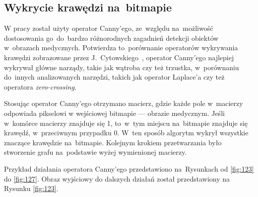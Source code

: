 \documentclass[a4paper,11pt,twoside,openright]{report}
\theoremstyle{definition}
\begin{document}
\subsection {Wykrycie krawędzi na~bitmapie}

W pracy został użyty operator Canny'ego, ze~względu na~możliwość dostosowania
go~do~bardzo różnorodnych zagadnień detekcji obiektów w~obrazach medycznych.
Potwierdza to~porównanie operatorów wykrywania krawędzi zobrazowane przez
J.~Cytowskiego~\cite{Cyfrowe przetwarzanie obrazów medycznych}, operator Canny'ego
najlepiej wykrywał główne narządy, takie jak wątroba czy też trzustka, w~porównaniu
do~innych analizowanych narzędzi, takich jak operator Laplace'a czy też operatora \textit{zero-crossing}.

Stosując operator Canny'ego otrzymano macierz, gdzie każde pole w~macierzy odpowiada pikselowi
w wejściowej bitmapie --- obrazie medycznym. Jeśli w~komórce macierzy znajduje
się 1, to~w~tym miejscu na~bitmapie znajduje się krawędź, w~przeciwnym przypadku
0. W~ten sposób algorytm wykrył wszystkie znaczące krawędzie na~bitmapie. Kolejnym
krokiem przetwarzania było stworzenie grafu na~podstawie wyżej wymienionej macierzy.

Przykład działania operatora Canny'ego przedstawiono na~Rysunkach od \ref{fig:123} do \ref{fig:127}.
Obraz wyjściowy do dalszych działań został przedstawiony na Rysunku \ref{fig:123}.

\end{document}
